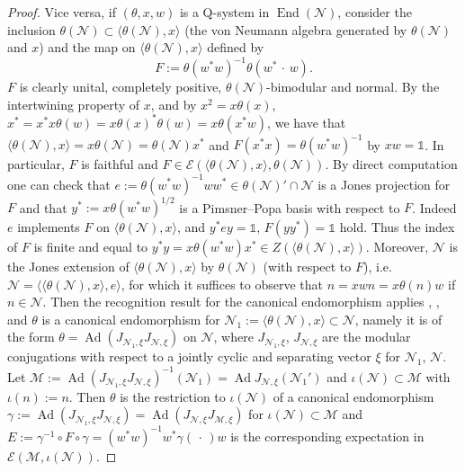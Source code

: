 \documentclass[11pt,a4paper]{article}
\makeatletter
\newcommand{\oneop}{\mathds{1}}
\newcommand{\slot}{{\,\cdot \,}}
\newcommand{\E}{\mathcal{E}}
\newcommand{\M}{\mathcal{M}}
\newcommand{\N}{\mathcal{N}}
\DeclareMathOperator{\End}{End}
\DeclareMathOperator{\Ad}{Ad}
\DeclareRobustCommand{\ie}{i.e.\@\xspace}
\DeclareRobustCommand{\Prop}{Prop.\@\xspace}
\DeclareRobustCommand{\Thm}{Thm.\@\xspace}
\theoremstyle{plain}
\theoremstyle{definition}
\theoremstyle{remark}
\numberwithin{equation}{section}%
\makeatother
\begin{document}
\begin{proof}
Vice versa, if $(\theta,x,w)$ is a Q-system in $\End(\N)$, consider the inclusion $\theta(\N) \subset \langle\theta(\N),x\rangle$ (the von Neumann algebra generated by $\theta(\N)$ and $x$) and the map on $\langle\theta(\N),x\rangle$ defined by
$$F := \theta(w^*w)^{-1}\theta(w^*\slot w).$$
$F$ is clearly unital, completely positive, $\theta(\N)$-bimodular and normal. By the intertwining property of $x$, and by $x^2 = x \theta(x)$, $x^* = x^*x\theta(w) = x\theta(x)^*\theta(w) = x\theta(x^*w)$, we have that $\langle\theta(\N),x\rangle = x \theta(\N) = \theta(\N) x^*$ and $F(x^*x) = \theta(w^*w)^{-1}$ by $xw=\oneop$. In particular, $F$ is faithful and $F\in\E(\langle\theta(\N),x\rangle,\theta(\N))$. By direct computation one can check that $e:= \theta(w^*w)^{-1}ww^*\in\theta(\N)'\cap\N$ is a Jones projection for $F$ and that $y^*:=x\theta(w^*w)^{1/2}$ is a Pimsner--Popa basis with respect to $F$. Indeed $e$ implements $F$ on $\langle\theta(\N),x\rangle$, and $y^*ey = \oneop$, $F(yy^*) = \oneop$ hold. Thus the index of $F$ is finite and equal to $y^*y = x\theta(w^*w)x^* \in Z(\langle\theta(\N),x\rangle)$.
Moreover, $\N$ is the Jones extension of $\langle\theta(\N),x\rangle$ by $\theta(\N)$ (with respect to $F$), \ie $\N=\langle \langle\theta(\N),x\rangle, e \rangle$, for which it suffices to observe that $n = x w n = x \theta(n) w$ if $n\in\N$. Then the recognition result for the canonical endomorphism applies \cite[\Thm 4.1]{Lon90}, \cite[\Prop 2.4]{FiIs99}, and $\theta$ is a canonical endomorphism for $\N_1 := \langle\theta(\N),x\rangle \subset \N$, namely it is of the form $\theta = \Ad(J_{\N_1,\xi}J_{\N,\xi})$ on $\N$, where $J_{\N_1,\xi}$, $J_{\N,\xi}$ are the modular conjugations with respect to a jointly cyclic and separating vector $\xi$ for $\N_1$, $\N$. Let $\M:= \Ad(J_{\N_1,\xi}J_{\N,\xi})^{-1}(\N_1) = \Ad{J_{\N,\xi}}(\N_1')$ and $\iota(\N)\subset\M$ with $\iota(n) := n$. Then $\theta$ is the restriction to $\iota(\N)$ of a canonical endomorphism $\gamma := \Ad(J_{\N_1,\xi}J_{\N,\xi}) = \Ad(J_{\N,\xi}J_{\M,\xi})$ for $\iota(\N)\subset\M$ and $E := \gamma^{-1} \circ F \circ \gamma = (w^*w)^{-1}w^*\gamma(\slot)w$ is the corresponding expectation in $\E(\M,\iota(\N))$.
\end{proof}
\end{document}
